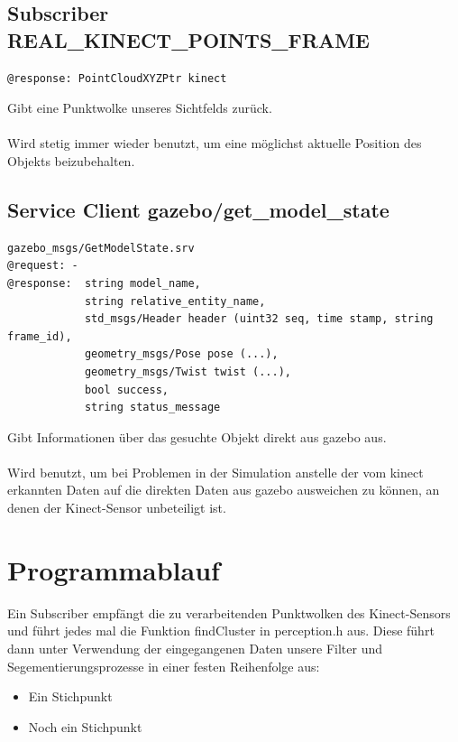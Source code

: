 \documentclass{suturo}
\begin{document}
\subsection*{Subscriber REAL\_KINECT\_POINTS\_FRAME}
\begin{verbatim}
@response: PointCloudXYZPtr kinect
\end{verbatim}
Gibt eine Punktwolke unseres Sichtfelds zurück.
\\ \\
Wird stetig immer wieder benutzt, um eine möglichst aktuelle Position des Objekts beizubehalten.

\subsection*{Service Client gazebo/get\_model\_state}
\begin{verbatim}
gazebo_msgs/GetModelState.srv
@request: -
@response:  string model_name,
            string relative_entity_name,
            std_msgs/Header header (uint32 seq, time stamp, string frame_id),
            geometry_msgs/Pose pose (...),
            geometry_msgs/Twist twist (...),
            bool success,
            string status_message
\end{verbatim}
Gibt Informationen über das gesuchte Objekt direkt aus gazebo aus.
\\ \\
Wird benutzt, um bei Problemen in der Simulation anstelle der vom kinect erkannten Daten auf die direkten Daten aus gazebo ausweichen zu können, an denen der Kinect-Sensor unbeteiligt ist.

\section*{Programmablauf}

Ein Subscriber empfängt die zu verarbeitenden Punktwolken des Kinect-Sensors und führt jedes mal die Funktion findCluster in perception.h aus. Diese führt dann unter Verwendung der eingegangenen Daten unsere Filter und Segementierungsprozesse in einer festen Reihenfolge aus:
\linebreak
\begin{itemize} 
\item Ein Stichpunkt 
\item Noch ein Stichpunkt 
\end{itemize}
\end{document}
